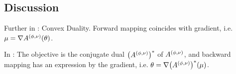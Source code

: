 \subsection{Discussion}

Further in \cite{wainwright_graphical_2008}: Convex Duality.
Forward mapping coincides with gradient, i.e. $\mu = \nabla A^{(\phi,\nu)}(\theta)$.

In \cite{wainwright_graphical_2008}:
The objective is the conjugate dual $\big(A^{(\phi,\nu)}\big)^*$ of $A^{(\phi,\nu)}$, and backward mapping has an expression by the gradient, i.e. $\theta = \nabla \big(A^{(\phi,\nu)}\big)^*(\mu)$.


